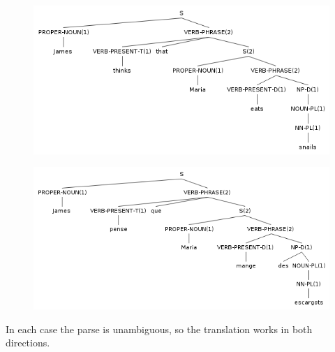 \documentclass[11pt]{article}
\begin{document}
\begin{figure}[H]
\includegraphics[scale=0.7]{james-thinks-that-maria-eats-snails.png}
\end{figure}
\begin{figure}[H]
\includegraphics[scale=0.7]{james-pense-que-maria-mange-des-escargots.png}
\end{figure}

In each case the parse is unambiguous, so the translation works in both directions.
\end{document}
